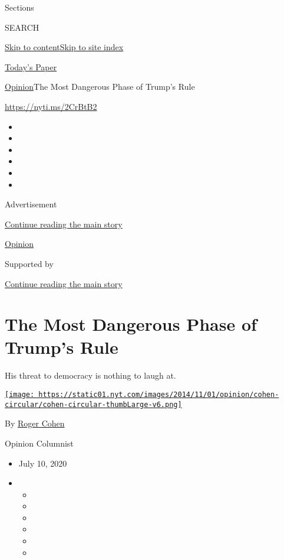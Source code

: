 Sections

SEARCH

\protect\hyperlink{site-content}{Skip to
content}\protect\hyperlink{site-index}{Skip to site index}

\href{https://myaccount.nytimes.com/auth/login?response_type=cookie\&client_id=vi}{}

\href{https://www.nytimes.com/section/todayspaper}{Today's Paper}

\href{/section/opinion}{Opinion}\textbar{}The Most Dangerous Phase of
Trump's Rule

\href{https://nyti.ms/2CrBtB2}{https://nyti.ms/2CrBtB2}

\begin{itemize}
\item
\item
\item
\item
\item
\item
\end{itemize}

Advertisement

\protect\hyperlink{after-top}{Continue reading the main story}

\href{/section/opinion}{Opinion}

Supported by

\protect\hyperlink{after-sponsor}{Continue reading the main story}

\hypertarget{the-most-dangerous-phase-of-trumps-rule}{%
\section{The Most Dangerous Phase of Trump's
Rule}\label{the-most-dangerous-phase-of-trumps-rule}}

His threat to democracy is nothing to laugh at.

\href{https://www.nytimes.com/by/roger-cohen}{\texttt{[image: https://static01.nyt.com/images/2014/11/01/opinion/cohen-circular/cohen-circular-thumbLarge-v6.png]}}

By \href{https://www.nytimes.com/by/roger-cohen}{Roger Cohen}

Opinion Columnist

\begin{itemize}
\item
  July 10, 2020
\item
  \begin{itemize}
  \item
  \item
  \item
  \item
  \item
  \item
  \end{itemize}
\end{itemize}

